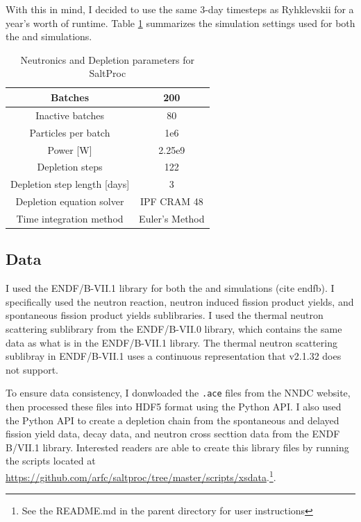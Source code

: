 With this in mind, I decided to use the same 3-day timesteps as Ryhklevskii
\cite{rykhlevskii_modeling_2019} for a year's worth of runtime. Table
\ref{tab:saltproc-params} summarizes the simulation settings used for both the
\SerpentTWO and \OpenMC simulations.
 
\begin{table}[htpb] 
    \centering 
    \caption{Neutronics and Depletion parameters for SaltProc}
    \label{tab:saltproc-params}
    \begin{tabular}{|c|c|} 
        \hline
        Batches & 200 \\
        \hline
        Inactive batches & 80 \\
        \hline
        Particles per batch & 1e6 \\
        \hline
        Power [W] & 2.25e9 \\
        \hline
        Depletion steps & 122 \\
        \hline
        Depletion step length [days] & 3 \\
        \hline
        Depletion equation solver & IPF CRAM 48 \\
        \hline
        Time integration method & Euler's Method \\
        \hline
    \end{tabular}
\end{table}

\subsection{Data}
\label{sub:results-xs-data}

I used the ENDF/B-VII.1 library for both the \SerpentTWO and
\OpenMC simulations (cite endfb). I specifically used the neutron reaction,
neutron induced fission product yields, and spontaneous fission product yields
sublibraries. I used the thermal neutron scattering sublibrary from the
ENDF/B-VII.0 library, which contains the same data as what is in the
ENDF/B-VII.1 library. The thermal neutron scattering sublibray in ENDF/B-VII.1
uses a continuous representation that \SerpentTWO v2.1.32 does not support.

To ensure data consistency, I donwloaded the \verb,.ace, files from the NNDC
website, then processed these files into HDF5 format using the \OpenMC Python
API. I also used the Python API to create a depletion chain from the
spontaneous and delayed fission yield data, decay data, and neutron cross
secttion data from the ENDF B/VII.1 library. Interested readers are able to
create this library files by running the scripts located at
\url{https://github.com/arfc/saltproc/tree/master/scripts/xsdata}.\footnote{See
the README.md in the parent directory for user instructions}.

